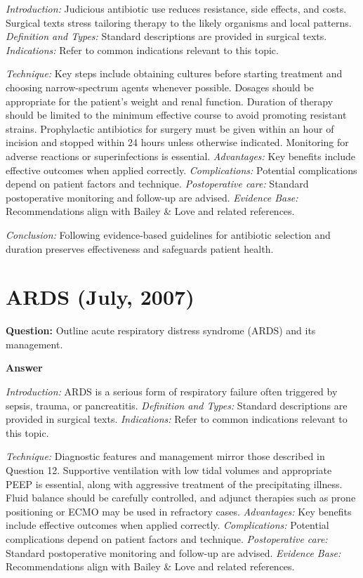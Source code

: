 \documentclass{article}
\begin{document}
\emph{Introduction:} Judicious antibiotic use reduces resistance, side effects, and costs. Surgical texts stress tailoring therapy to the likely organisms and local patterns.
\emph{Definition and Types:} Standard descriptions are provided in surgical texts.
\emph{Indications:} Refer to common indications relevant to this topic.

\emph{Technique:} Key steps include obtaining cultures before starting treatment and choosing narrow-spectrum agents whenever possible. Dosages should be appropriate for the patient's weight and renal function. Duration of therapy should be limited to the minimum effective course to avoid promoting resistant strains. Prophylactic antibiotics for surgery must be given within an hour of incision and stopped within 24 hours unless otherwise indicated. Monitoring for adverse reactions or superinfections is essential.
\emph{Advantages:} Key benefits include effective outcomes when applied correctly.
\emph{Complications:} Potential complications depend on patient factors and technique.
\emph{Postoperative care:} Standard postoperative monitoring and follow-up are advised.
\emph{Evidence Base:} Recommendations align with Bailey \& Love and related references.

\emph{Conclusion:} Following evidence-based guidelines for antibiotic selection and duration preserves effectiveness and safeguards patient health.


\section{ARDS (July, 2007)}

\textbf{Question:} Outline acute respiratory distress syndrome (ARDS) and its management.

\textbf{Answer}

\emph{Introduction:} ARDS is a serious form of respiratory failure often triggered by sepsis, trauma, or pancreatitis.
\emph{Definition and Types:} Standard descriptions are provided in surgical texts.
\emph{Indications:} Refer to common indications relevant to this topic.

\emph{Technique:} Diagnostic features and management mirror those described in Question 12. Supportive ventilation with low tidal volumes and appropriate PEEP is essential, along with aggressive treatment of the precipitating illness. Fluid balance should be carefully controlled, and adjunct therapies such as prone positioning or ECMO may be used in refractory cases.
\emph{Advantages:} Key benefits include effective outcomes when applied correctly.
\emph{Complications:} Potential complications depend on patient factors and technique.
\emph{Postoperative care:} Standard postoperative monitoring and follow-up are advised.
\emph{Evidence Base:} Recommendations align with Bailey \& Love and related references.
\end{document}
